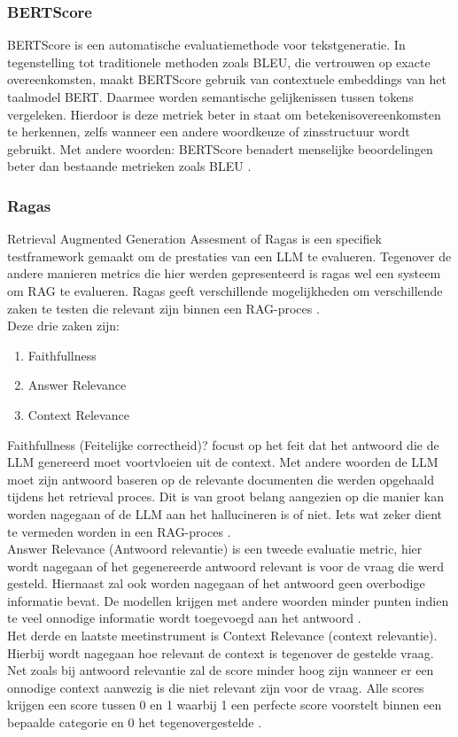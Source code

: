 \subsubsection{BERTScore}

BERTScore is een automatische evaluatiemethode voor tekstgeneratie. In tegenstelling tot traditionele methoden zoals BLEU, die vertrouwen op exacte overeenkomsten, maakt BERTScore gebruik van contextuele embeddings van het taalmodel BERT. Daarmee worden semantische gelijkenissen tussen tokens vergeleken. Hierdoor is deze metriek beter in staat om betekenisovereenkomsten te herkennen, zelfs wanneer een andere woordkeuze of zinsstructuur wordt gebruikt. Met andere woorden: BERTScore benadert menselijke beoordelingen beter dan bestaande metrieken zoals BLEU \autocite{Zhang2019}.

\subsubsection{Ragas}

Retrieval Augmented Generation Assesment of Ragas is een specifiek testframework gemaakt om de prestaties van een LLM te evalueren. Tegenover de andere manieren metrics die hier werden gepresenteerd is ragas wel een systeem om RAG te evalueren. Ragas geeft verschillende mogelijkheden om verschillende zaken te testen die relevant zijn binnen een RAG-proces \autocite{Es2023}.
\\[1em]
Deze drie zaken zijn:
\begin{enumerate}
    \item Faithfullness
    \item Answer Relevance
    \item Context Relevance
\end{enumerate}

Faithfullness (Feitelijke correctheid)? focust op het feit dat het antwoord die de LLM genereerd moet voortvloeien uit de context. Met andere woorden de LLM moet zijn antwoord baseren op de relevante documenten die werden opgehaald tijdens het retrieval proces. Dit is van groot belang aangezien op die manier kan worden nagegaan of de LLM aan het hallucineren is of niet. Iets wat zeker dient te vermeden worden in een RAG-proces \autocite{Es2023}.
\\[1em]
Answer Relevance (Antwoord relevantie) is een tweede evaluatie metric, hier wordt nagegaan of het gegenereerde antwoord relevant is voor de vraag die werd gesteld. Hiernaast zal ook worden nagegaan of het antwoord geen overbodige informatie bevat. De modellen krijgen met andere woorden minder punten indien te veel onnodige informatie wordt toegevoegd aan het antwoord \autocite{Es2023}.
\\[1em]
Het derde en laatste meetinstrument is Context Relevance (context relevantie). Hierbij wordt nagegaan hoe relevant de context is tegenover de gestelde vraag. Net zoals bij antwoord relevantie zal de score minder hoog zijn wanneer er een onnodige context aanwezig is die niet relevant zijn voor de vraag. Alle scores krijgen een score tussen 0 en 1 waarbij 1 een perfecte score voorstelt binnen een bepaalde categorie en 0 het tegenovergestelde \autocite{Es2023}.

